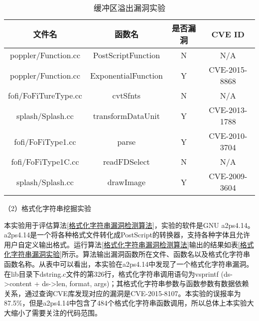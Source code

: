 {\begin{table}[ht]
\begin{center}
\caption{缓冲区溢出漏洞实验} \label{缓冲区溢出漏洞实验}
\begin{small}
\begin{tabular}{cccc}
\hline 
文件名 & 函数名 & 是否漏洞 & CVE ID\tabularnewline
\hline 
poppler/Function.cc & PostScriptFunction & N & N/A\tabularnewline
poppler/Function.cc & ExponentialFunction & Y & CVE-2015-8868\tabularnewline


fofi/FoFiTureType.cc & cvtSfnts & N & N/A\tabularnewline

splash/Splash.cc & transformDataUnit & Y & CVE-2013-1788\tabularnewline

 
fofi/FoFiType1.cc & parse & Y & CVE-2010-3704\tabularnewline

fofi/FoFiType1C.cc & readFDSelect & N & N/A\tabularnewline

splash/Splash.cc & drawImage & Y & CVE-2009-3604\tabularnewline

\hline 
\end{tabular}
\end{small}
\end{center}
\end{table}

（2）格式化字符串挖掘实验

本实验用于评估算法\ref{格式化字符串漏洞检测算法}，实验的软件是GNU a2ps4.14。a2ps4.14是一个将各种格式文件转化成PostScript的转换器，支持各种字体且允许用户自定义输出格式。运行算法\ref{格式化字符串漏洞检测算法}输出的结果如表\ref{格式化字符串漏洞实验}所示。算法输出漏洞函数所在文件、函数名以及格式化字符串函数名称。从表中可以看出，本实验在a2ps4.14中发现了一个格式化字符串漏洞。在lib目录下dstring.c文件的第326行，格式化字符串调用语句为vsprintf (ds->content + ds->len, format, args)；其格式化字符串参数与函数参数有数据依赖关系，通过查询CVE库发现对应的漏洞是CVE-2015-8107。本实验的误报率为87.5\%，但是a2ps4.14中包含了484个格式化字符串函数调用，所以总体上本实验大大缩小了需要关注的代码范围。

}

